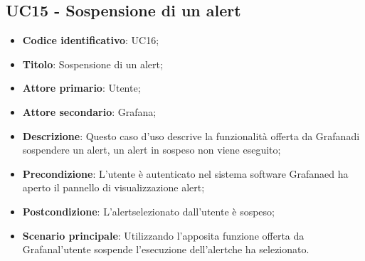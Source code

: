 \subsection{UC15 - Sospensione di un alert}
\begin{itemize}
	\item \textbf{Codice identificativo}: UC16;
	\item \textbf{Titolo}: Sospensione di un alert\glo;
	\item \textbf{Attore primario}: Utente;
	\item \textbf{Attore secondario}: Grafana\glo;
	\item \textbf{Descrizione}: Questo caso d'uso descrive la funzionalità offerta da Grafana\glosp di sospendere un alert\glosp, un alert in sospeso non viene eseguito;
	\item \textbf{Precondizione}: L'utente è autenticato nel sistema software Grafana\glosp ed ha aperto il pannello di visualizzazione alert\glo;
	\item \textbf{Postcondizione}: L'alert\glosp selezionato dall'utente è sospeso;
	\item \textbf{Scenario principale}: Utilizzando l'apposita funzione offerta da Grafana\glosp l'utente sospende l'esecuzione dell'alert\glosp che ha selezionato.
\end{itemize} 
